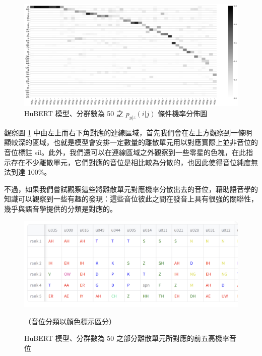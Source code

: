 \begin{figure}
    \centering
    \includegraphics[width=1\linewidth]{figures/11111111.png}
    \caption{HuBERT 模型、分群數為 50 之 $p_{y|z}(i|j)$ 條件機率分佈圖}
    \label{fig:hubert-50-givenunit-byprob}
\end{figure}
        觀察圖 \ref{fig:hubert-50-givenunit-byprob} 中由左上而右下角對應的連線區域，首先我們會在左上方觀察到一條明顯較深的區域，也就是模型會安排一定數量的離散單元用以對應實際上並非音位的音位標註 sil。此外，我們還可以在連線區域之外觀察到一些零星的色塊，在此指示存在不少離散單元，它們對應的音位是相比較為分散的，也因此使得音位純度無法到達 100\%。

        不過，如果我們嘗試觀察這些將離散單元對應機率分散出去的音位，藉助語音學的知識可以觀察到一些有趣的發現：這些音位彼此之間在發音上具有很強的關聯性，幾乎與語音學提供的分類是對應的。 


        \begin{figure}
            \centering
            \includegraphics[width=1\linewidth]{figures/unit_rank_phn.png}  %
            \caption[]{
 HuBERT 模型、分群數為 50 之部分離散單元所對應的前五高機率音位
}
                                          （音位分類以顏色標示區分）
            \label{fig:unit-to-phn-rankings}
        \end{figure}
        
